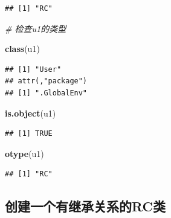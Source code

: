 \documentclass[]{book}
\newenvironment{Shaded}{\begin{snugshade}}{\end{snugshade}}
\newcommand{\KeywordTok}[1]{\textcolor[rgb]{0.13,0.29,0.53}{\textbf{#1}}}
\newcommand{\CommentTok}[1]{\textcolor[rgb]{0.56,0.35,0.01}{\textit{#1}}}
\newcommand{\NormalTok}[1]{#1}
\begin{document}
\begin{verbatim}
## [1] "RC"
\end{verbatim}

\begin{Shaded}
\begin{Highlighting}[]
\CommentTok{# 检查u1的类型}

\KeywordTok{class}\NormalTok{(u1)}
\end{Highlighting}
\end{Shaded}

\begin{verbatim}
## [1] "User"
## attr(,"package")
## [1] ".GlobalEnv"
\end{verbatim}

\begin{Shaded}
\begin{Highlighting}[]
\KeywordTok{is.object}\NormalTok{(u1)}
\end{Highlighting}
\end{Shaded}

\begin{verbatim}
## [1] TRUE
\end{verbatim}

\begin{Shaded}
\begin{Highlighting}[]
\KeywordTok{otype}\NormalTok{(u1)}
\end{Highlighting}
\end{Shaded}

\begin{verbatim}
## [1] "RC"
\end{verbatim}

\subsection{创建一个有继承关系的RC类}\label{rc}
\end{document}
